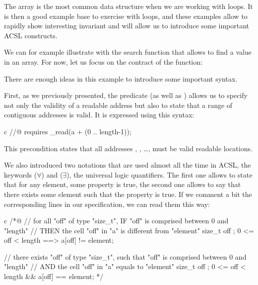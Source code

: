 \label{l3:statements-loops-examples-ro}


The array is the most common data structure when we are working with loops.
It is then a good example base to exercise with loops, and these
examples allow to rapidly show interesting invariant and will allow us
to introduce some important ACSL constructs.


We can for example illustrate with the search function that allows to find a
value in an array. For now, let us focus on the contract of the function:




There are enough ideas in this example to introduce some important syntax.


First, as we previously presented, the
 predicate (as well as
) allows us to specify not only the
validity of a readable address but also to state that a range of
contiguous addresses is valid. It is expressed using this syntax:


\begin{CodeBlock}{c}
//@ requires \valid_read(a + (0 .. length-1));
\end{CodeBlock}


This precondition states that all addresses ,
, \ldots{},  must be valid readable
locations.


We also introduced two notations that are used almost all the time in
ACSL, the keywords  ($\forall$) and
 ($\exists$), the universal logic
quantifiers. The first one allows to state that for any element, some
property is true, the second one allows to say that there exists some
element such that the property is true. If we comment a bit the
corresponding lines in our specification, we can read them this way:


\begin{CodeBlock}{c}
/*@
// for all "off" of type "size_t", IF "off" is comprised between 0 and "length"
//                                 THEN the cell "off" in "a" is different from "element"
\forall size_t off ; 0 <= off < length ==> a[off] != element;

// there exists "off" of type "size_t", such that "off" is comprised between 0 and "length"
//                                      AND the cell "off" in "a" equals to "element"
\exists size_t off ; 0 <= off < length && a[off] == element;
*/
\end{CodeBlock}


